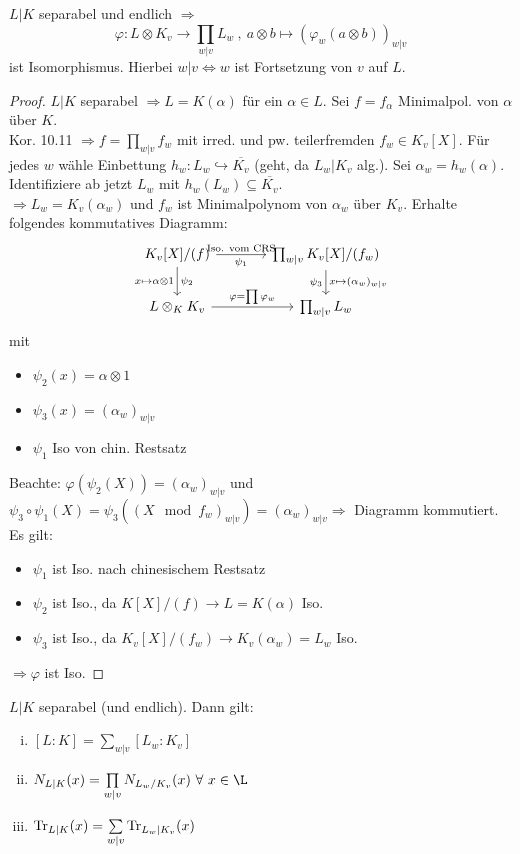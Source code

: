 \begin{Prop}
$L|K$ separabel und endlich $\Rightarrow$
\[\varphi: L \otimes K_v \to \prod_{w|v} L_w \ , \ a \otimes b \mapsto (\varphi_w(a\otimes b))_{w|v}\]
ist Isomorphismus. Hierbei $w|v \iff w$ ist Fortsetzung von $v$ auf $L$.
\end{Prop}

\begin{proof}
$L|K$ separabel $\Rightarrow L=K(\alpha)$ für ein $\alpha \in L$. Sei $f=f_\alpha$ Minimalpol. von $\alpha$ über $K$.\\
Kor. 10.11 $\Rightarrow f=\prod_{w|v} f_w$ mit irred. und pw. teilerfremden $f_w \in K_v[X]$. Für jedes $w$ wähle Einbettung $h_w : L_w \hookrightarrow \overline{K_v}$ (geht, da $L_w|K_v$ alg.). Sei $\alpha_w = h_w(\alpha)$. Identifiziere ab jetzt $L_w$ mit $h_w(L_w) \subseteq \overline{K_v}$.\\
$\Rightarrow L_w = K_v(\alpha_w)$ und $f_w$ ist Minimalpolynom von $\alpha_w$ über $K_v$. Erhalte folgendes kommutatives Diagramm:
\[\begin{tikzcd}[column sep = large]
K_v[X]/(f) \arrow{r}[swap]{\psi_1}{\text{Iso. vom CRS}} \arrow{d}{\psi_2}[swap]{x \mapsto \alpha \otimes 1} & \prod_{w|v} K_v[X]/(f_w) \arrow{d}[swap]{\psi_3}{x \mapsto (\alpha_w)_{w|v}}\\
L\otimes_K K_v \arrow{r}{\varphi=\prod \varphi_w} & \prod_{w|v} L_w
\end{tikzcd}
\]
mit \begin{itemize}
\item $\psi_2(x)=\alpha \otimes 1$
\item $\psi_3(x)=(\alpha_w)_{w|v}$
\item $\psi_1$ Iso von chin. Restsatz
\end{itemize}
Beachte: $\varphi(\psi_2(X))=(\alpha_w)_{w|v}$ und $\psi_3 \circ \psi_1(X)=\psi_3((X \mod f_w)_{w|v})=(\alpha_w)_{w|v} \Rightarrow$ Diagramm kommutiert.\\
Es gilt:
\begin{itemize}
\item $\psi_1$ ist Iso. nach chinesischem Restsatz
\item $\psi_2$ ist Iso., da $K[X]/(f) \to L=K(\alpha)$ Iso.
\item $\psi_3$ ist Iso., da $K_v[X]/(f_w) \to K_v(\alpha_w)=L_w$ Iso.
\end{itemize}
$\Rightarrow \varphi$ ist Iso.
\end{proof}

\begin{Kor}
$L|K$ separabel (und endlich). Dann gilt:
\begin{enumerate}[i)]
\item $[L:K]=\sum\limits_{w|v} [L_w:K_v]$
\item $N_{L|K}(x)=\prod\limits_{w|v} N_{L_w/K_v}(x) \ \forall \ x \in \L$
\item $\operatorname{Tr}_{L|K}(x)= \sum\limits_{w|v} \operatorname{Tr}_{L_w|K_v}(x)$
\end{enumerate}
\end{Kor}

